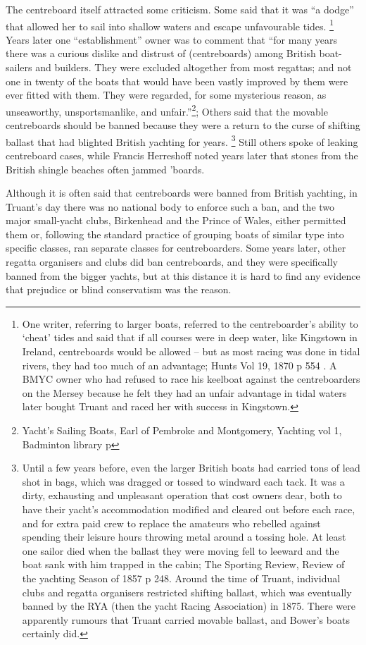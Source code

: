 \documentclass[
  letterpaper,
]{scrbook}
\begin{document}
The centreboard itself attracted some criticism. Some said that it was
``a dodge'' that allowed her to sail into shallow waters and escape
unfavourable tides. \footnote{One writer, referring to larger boats,
  referred to the centreboarder's ability to `cheat' tides and said that
  if all courses were in deep water, like Kingstown in Ireland,
  centreboards would be allowed -- but as most racing was done in tidal
  rivers, they had too much of an advantage; Hunts Vol 19, 1870 p 554 .
  A BMYC owner who had refused to race his keelboat against the
  centreboarders on the Mersey because he felt they had an unfair
  advantage in tidal waters later bought Truant and raced her with
  success in Kingstown.} Years later one ``establishment'' owner was to
comment that ``for many years there was a curious dislike and distrust
of (centreboards) among British boat-sailers and builders. They were
excluded altogether from most regattas; and not one in twenty of the
boats that would have been vastly improved by them were ever fitted with
them. They were regarded, for some mysterious reason, as unseaworthy,
unsportsmanlike, and unfair.''\footnote{Yacht's Sailing Boats, Earl of
  Pembroke and Montgomery, Yachting vol 1, Badminton library p}; Others
said that the movable centreboards should be banned because they were a
return to the curse of shifting ballast that had blighted British
yachting for years. \footnote{Until a few years before, even the larger
  British boats had carried tons of lead shot in bags, which was dragged
  or tossed to windward each tack. It was a dirty, exhausting and
  unpleasant operation that cost owners dear, both to have their yacht's
  accommodation modified and cleared out before each race, and for extra
  paid crew to replace the amateurs who rebelled against spending their
  leisure hours throwing metal around a tossing hole. At least one
  sailor died when the ballast they were moving fell to leeward and the
  boat sank with him trapped in the cabin; The Sporting Review, Review
  of the yachting Season of 1857 p 248. Around the time of Truant,
  individual clubs and regatta organisers restricted shifting ballast,
  which was eventually banned by the RYA (then the yacht Racing
  Association) in 1875. There were apparently rumours that Truant
  carried movable ballast, and Bower's boats certainly did.} Still
others spoke of leaking centreboard cases, while Francis Herreshoff
noted years later that stones from the British shingle beaches often
jammed 'boards.

Although it is often said that centreboards were banned from British
yachting, in Truant's day there was no national body to enforce such a
ban, and the two major small-yacht clubs, Birkenhead and the Prince of
Wales, either permitted them or, following the standard practice of
grouping boats of similar type into specific classes, ran separate
classes for centreboarders. Some years later, other regatta organisers
and clubs did ban centreboards, and they were specifically banned from
the bigger yachts, but at this distance it is hard to find any evidence
that prejudice or blind conservatism was the reason.
\end{document}
